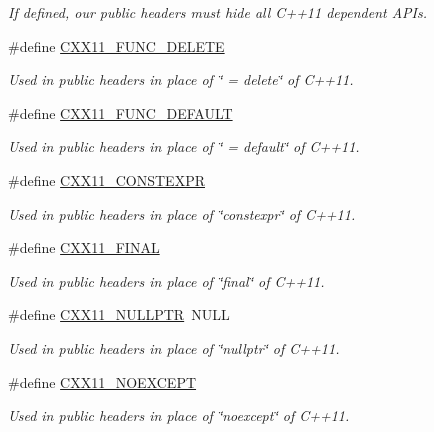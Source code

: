 \begin{DoxyCompactItemize}
\begin{DoxyCompactList}\small\item\em If defined, our public headers must hide all C++11 dependent A\+P\+Is. \end{DoxyCompactList}\item 
\#define \hyperlink{group__CXX11_ga18bdd5282925d452976785b1f70eba98}{C\+X\+X11\+\_\+\+F\+U\+N\+C\+\_\+\+D\+E\+L\+E\+TE}
\begin{DoxyCompactList}\small\item\em Used in public headers in place of \char`\"{} = delete\char`\"{} of C++11. \end{DoxyCompactList}\item 
\#define \hyperlink{group__CXX11_gacd6ace18714e73ede1ed218faa714d89}{C\+X\+X11\+\_\+\+F\+U\+N\+C\+\_\+\+D\+E\+F\+A\+U\+LT}
\begin{DoxyCompactList}\small\item\em Used in public headers in place of \char`\"{} = default\char`\"{} of C++11. \end{DoxyCompactList}\item 
\#define \hyperlink{group__CXX11_ga5edfc30895e89f518518ec6f4d30e50d}{C\+X\+X11\+\_\+\+C\+O\+N\+S\+T\+E\+X\+PR}
\begin{DoxyCompactList}\small\item\em Used in public headers in place of \char`\"{}constexpr\char`\"{} of C++11. \end{DoxyCompactList}\item 
\#define \hyperlink{group__CXX11_ga8fa8c50816d1a7bcb181369e828097c4}{C\+X\+X11\+\_\+\+F\+I\+N\+AL}
\begin{DoxyCompactList}\small\item\em Used in public headers in place of \char`\"{}final\char`\"{} of C++11. \end{DoxyCompactList}\item 
\#define \hyperlink{group__CXX11_ga213f92e16813051c59cdccf6d28baa78}{C\+X\+X11\+\_\+\+N\+U\+L\+L\+P\+TR}~N\+U\+LL
\begin{DoxyCompactList}\small\item\em Used in public headers in place of \char`\"{}nullptr\char`\"{} of C++11. \end{DoxyCompactList}\item 
\#define \hyperlink{group__CXX11_ga191c695299b123fef8ac8b6ba1c018c7}{C\+X\+X11\+\_\+\+N\+O\+E\+X\+C\+E\+PT}
\begin{DoxyCompactList}\small\item\em Used in public headers in place of \char`\"{}noexcept\char`\"{} of C++11. \end{DoxyCompactList}\item 

\end{DoxyCompactItemize}

